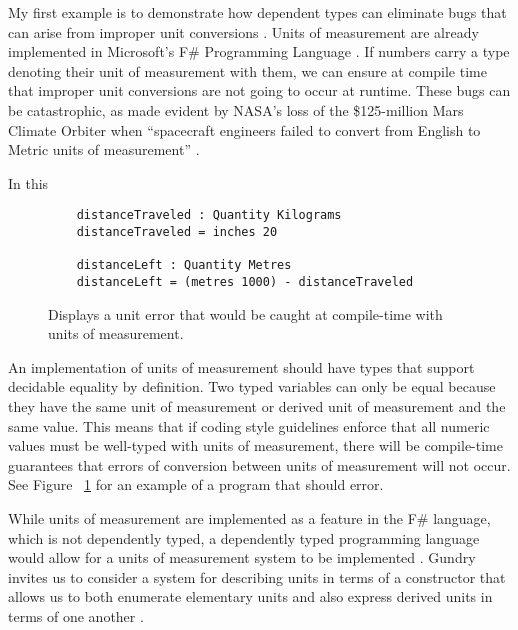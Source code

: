 My first example is to demonstrate how dependent types can eliminate bugs that
can arise from improper unit conversions \cite{gundry2013}. Units of measurement
are already implemented in Microsoft's F\# Programming Language
\cite{kennedy2009}. If numbers carry a type denoting their unit of measurement
with them, we can ensure at compile time that improper unit conversions are not
going to occur at runtime. These bugs can be catastrophic, as made evident by
NASA's loss of the \$125-million Mars Climate Orbiter when ``spacecraft
engineers failed to convert from English to Metric units of measurement''
\cite{hotz1999}. 

In this

\begin{figure}[ht!]
  \caption{Displays a unit error that would be caught at compile-time with units of measurement.}
  \label{unit_error}
  \begin{lstlisting}
    distanceTraveled : Quantity Kilograms
    distanceTraveled = inches 20

    distanceLeft : Quantity Metres
    distanceLeft = (metres 1000) - distanceTraveled
  \end{lstlisting}
\end{figure}

An implementation of units of measurement should have types that support
decidable equality by definition. Two typed variables can only be equal because
they have the same unit of measurement or derived unit of measurement and the
same value. This means that if coding style guidelines enforce that all numeric
values must be well-typed with units of measurement, there will be compile-time
guarantees that errors of conversion between units of measurement will not
occur. See Figure ~\ref{unit_error} for an example of a program that should
error. 

While units of measurement are implemented as a feature in the F\# language,
which is not dependently typed, a dependently typed programming language would
allow for a units of measurement system to be implemented \cite{gundry2013}.
Gundry invites us to consider a system for describing units in terms of a
constructor that allows us to both enumerate elementary units and also express
derived units in terms of one another \cite{gundry2013}. 

